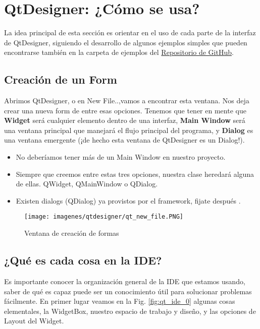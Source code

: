 \section{QtDesigner: ¿C\'omo se usa?}
La idea principal de esta secci\'on es orientar en el uso de cada parte de la interfaz de QtDesigner, siguiendo
el desarrollo de algunos ejemplos simples que pueden encontrarse tambi\'en en la carpeta de ejemplos del \href{https://github.com/nicotrozzo/pyqt5-tutorials}{Repositorio de GitHub}.

\subsection{Creaci\'on de un Form} Abrimos QtDesigner, o en New File..,vamos a encontrar esta ventana. Nos deja crear
una nueva form de entre esas opciones. Tenemos que tener en mente que \textbf{Widget} ser\'a cualquier elemento dentro de una interfaz,
\textbf{Main Window} ser\'a una ventana principal que manejar\'a el flujo principal del programa, y \textbf{Dialog} es una ventana emergente (¡de hecho
esta ventana de QtDesigner es un Dialog!).


\begin{itemize}
    \item No deber\'iamos tener m\'as de un Main Window en nuestro proyecto.
    \item Siempre que creemos entre estas tres opciones, nuestra clase heredar\'a alguna de ellas. QWidget, QMainWindow o QDialog.
    \item Existen dialogs (QDialog) ya provistos por el framework, fijate despu\'es .
\end{itemize}

\begin{figure}[H]
    \centering
    \texttt{[image: imagenes/qtdesigner/qt\_new\_file.PNG]}
    \caption{Ventana de creaci\'on de formas}
    \label{fig:qt_new_file}
\end{figure}

\subsection{¿Qu\'e es cada cosa en la IDE?}
Es importante conocer la organizaci\'on general de la IDE que estamos usando, saber de qu\'e es capaz puede ser un conocimiento
\'util para solucionar problemas f\'acilmente. En primer lugar veamos en la Fig. \ref{fig:qt_ide_0} algunas cosas elementales, la WidgetBox,
nuestro espacio de trabajo y dise\~no, y las opciones de Layout del Widget.

